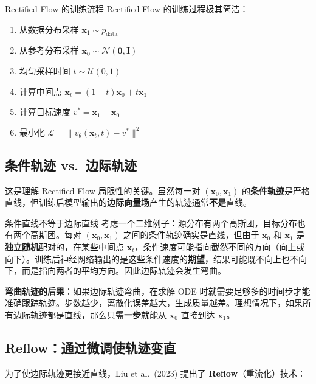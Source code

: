 \documentclass[a4paper]{article}
\begin{document}
\begin{importantbox}{Rectified Flow 的训练流程}
Rectified Flow 的训练过程极其简洁：
\begin{enumerate}
    \item 从数据分布采样 $\mathbf{x}_1 \sim p_{\text{data}}$
    \item 从参考分布采样 $\mathbf{x}_0 \sim \mathcal{N}(\mathbf{0}, \mathbf{I})$
    \item 均匀采样时间 $t \sim \mathcal{U}(0, 1)$
    \item 计算中间点 $\mathbf{x}_t = (1-t)\mathbf{x}_0 + t\mathbf{x}_1$
    \item 计算目标速度 $v^* = \mathbf{x}_1 - \mathbf{x}_0$
    \item 最小化 $\mathcal{L} = \| v_\theta(\mathbf{x}_t, t) - v^* \|^2$
\end{enumerate}
\end{importantbox}

\subsection{条件轨迹 vs.\ 边际轨迹}

这是理解 Rectified Flow 局限性的关键。虽然每一对 $(\mathbf{x}_0, \mathbf{x}_1)$ 的\textbf{条件轨迹}是严格直线，但训练后模型输出的\textbf{边际向量场}产生的轨迹通常\textbf{不是}直线。

\begin{warningbox}{条件直线不等于边际直线}
考虑一个二维例子：源分布有两个高斯团，目标分布也有两个高斯团。每对 $(\mathbf{x}_0, \mathbf{x}_1)$ 之间的条件轨迹确实是直线，但由于 $\mathbf{x}_0$ 和 $\mathbf{x}_1$ 是\textbf{独立随机}配对的，在某些中间点 $\mathbf{x}_t$，条件速度可能指向截然不同的方向（向上或向下）。训练后神经网络输出的是这些条件速度的\textbf{期望}，结果可能既不向上也不向下，而是指向两者的平均方向。因此边际轨迹会发生弯曲。
\end{warningbox}

\textbf{弯曲轨迹的后果}：如果边际轨迹弯曲，在求解 ODE 时就需要足够多的时间步才能准确跟踪轨迹。步数越少，离散化误差越大，生成质量越差。理想情况下，如果所有边际轨迹都是直线，那么只需\textbf{一步}就能从 $\mathbf{x}_0$ 直接到达 $\mathbf{x}_1$。

\subsection{Reflow：通过微调使轨迹变直}

为了使边际轨迹更接近直线，Liu et al.\ (2023) 提出了 \textbf{Reflow}（重流化）技术：
\end{document}
